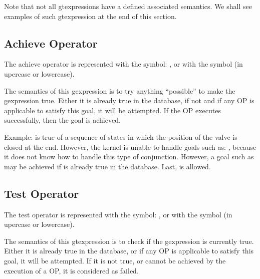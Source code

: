 Note that not all gtexpressions have a defined associated semantics. We
shall see examples of such gtexpression at the end of this section.



\subsection{Achieve Operator}

The achieve operator is represented with the symbol: \samp{!}, or with the
symbol  (in upercase or lowercase).

The semantics of this gexpression is to try anything ``possible'' to make the
gexpression true. Either it is already true in the database, if not and if any
OP is applicable to satisfy this goal, it will be attempted. If the OP executes
successfully, then the goal is achieved.

Example:  is true of a sequence of states in
which the position of the valve is closed at the end. However, the kernel is
unable to handle goals such as: , because it does not know how to handle this type of
conjunction. However, a goal such as  may be achieved if  is already true in the database. Last,  is allowed.

\subsection{Test Operator}

The test operator is represented with the symbol: , or with the
symbol  (in upercase or lowercase).

The semantics of this gtexpression is to check if the gexpression is
currently true. Either it is already true in the database, or if any OP is
applicable to satisfy this goal, it will be attempted. If it is not true,
or cannot be achieved by the execution of a OP, it is considered as
failed.

